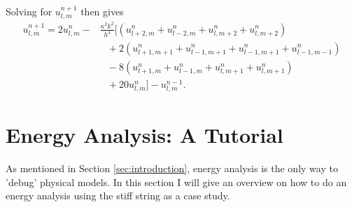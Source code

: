 \documentclass{article}
\begin{document}
Solving for $u_{l,m}^{n+1}$ then gives 
\begin{equation}
    \begin{aligned}
    u_{l,m}^{n+1} = 2u_{l,m}^n-&\frac{\kappa^2k^2}{h^4} \big[(u_{l+2, m}^n + u_{l-2, m}^n+u_{l, m+2}^n+u_{l, m+2}^n)\\
    & \ \ \; +2(u_{l+1, m+1}^n + u_{l-1, m+1}^n+u_{l-1, m+1}^n+u_{l-1, m-1}^n)\\
    & \ \ \; -8(u_{l+1, m}^n + u_{l-1, m}^n+u_{l, m+1}^n+u_{l, m+1}^n)\\
    & \ \ \; +20u_{l,m}^n\big]- u_{l,m}^{n-1}.
    \end{aligned}
\end{equation}

\section{Energy Analysis: A Tutorial}\label{sec:energy}
As mentioned in Section \ref{sec:introduction}, energy analysis is the only way to 'debug' physical models. In this section I will give an overview on how to do an energy analysis using the stiff string as a case study. 
\end{document}
